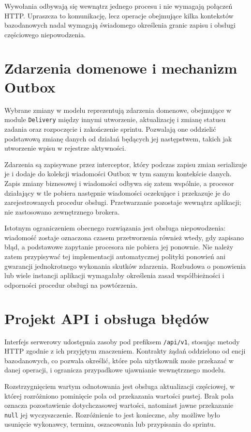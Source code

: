 Wywołania odbywają się wewnątrz jednego procesu i nie wymagają połączeń HTTP. Upraszcza to komunikację, lecz operacje obejmujące kilka kontekstów bazodanowych nadal wymagają świadomego określenia granic zapisu i obsługi częściowego niepowodzenia.

\section{Zdarzenia domenowe i mechanizm Outbox}

Wybrane zmiany w modelu reprezentują zdarzenia domenowe, obejmujące w module \texttt{Delivery} między innymi utworzenie, aktualizację i zmianę statusu zadania oraz rozpoczęcie i zakończenie sprintu. Pozwalają one oddzielić podstawową zmianę danych od działań będących jej następstwem, takich jak utworzenie wpisu w rejestrze aktywności.

Zdarzenia są zapisywane przez interceptor, który podczas zapisu zmian serializuje je i dodaje do kolekcji wiadomości Outbox w tym samym kontekście danych. Zapis zmiany biznesowej i wiadomości odbywa się zatem wspólnie, a procesor działający w tle pobiera następnie wiadomości oczekujące i przekazuje je do zarejestrowanych procedur obsługi. Przetwarzanie pozostaje wewnątrz aplikacji; nie zastosowano zewnętrznego brokera.

Istotnym ograniczeniem obecnego rozwiązania jest obsługa niepowodzenia: wiadomość zostaje oznaczona czasem przetworzenia również wtedy, gdy zapisano błąd, a podstawowe zapytanie procesora nie pobiera jej ponownie. Nie należy zatem przypisywać tej implementacji automatycznej polityki ponowień ani gwarancji jednokrotnego wykonania skutków zdarzenia. Rozbudowa o ponowienia lub wiele instancji aplikacji wymagałaby określenia zasad współbieżności i odporności procedur obsługi na powtórzenia.

\section{Projekt API i obsługa błędów}

Interfejs serwerowy udostępnia zasoby pod prefiksem \texttt{/api/v1}, stosując metody HTTP zgodnie z ich przyjętym znaczeniem. Kontrakty żądań oddzielono od encji bazodanowych, co pozwala określić, które pola użytkownik może przekazać w danej operacji, i ogranicza przypadkowe ujawnianie wewnętrznego modelu.

Rozstrzygnięciem wartym odnotowania jest obsługa aktualizacji częściowej, w której rozróżniono pominięcie pola od przekazania wartości pustej. Brak pola oznacza pozostawienie dotychczasowej wartości, natomiast jawne przekazanie \texttt{null} jej wyczyszczenie. Rozróżnienie to jest konieczne, aby możliwe było usunięcie wykonawcy, terminu, oszacowania lub przypisania do sprintu.


